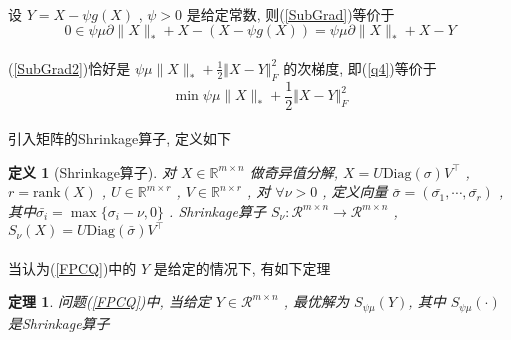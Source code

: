 \documentclass[a4paper, UTF8]{ctexart}				%
\newtheorem{theo}{\bf 定理}[section]			  %
\newtheorem{define}{\bf 定义}[section]
\numberwithin{equation}{section}				%
\newcommand{\upcite}[1]{\textsuperscript{\textsuperscript{\cite{#1}}}}
\begin{document}
			\paragraph{}
				\quad 设 $Y = X - \psi g(X)$ , $\psi > 0$ 是给定常数, 则(\ref{SubGrad})等价于
				\begin{equation}\label{SubGrad2}
					0 \in \psi \mu \partial \lVert{X}\rVert_* + X - (X - \psi g(X)) = \psi \mu \partial \lVert{X}\rVert_* + X -Y
				\end{equation}

			\paragraph{}
				\quad (\ref{SubGrad2})恰好是 $\psi \mu \lVert{X}\rVert_* + \frac{1}{2} \Vert{X - Y}\Vert^2_F$ 的次梯度, 即(\ref{q4})等价于 
				\begin{equation}\label{FPCQ}
					\min \psi \mu \lVert{X}\rVert_* + \frac{1}{2} \Vert{X - Y}\Vert^2_F
				\end{equation}
			
			\paragraph{}
				\quad 引入矩阵的Shrinkage算子\upcite{ma2011fixed}, 定义如下

			\begin{define}[Shrinkage算子]
				对 $X \in \mathbb{R}^{m \times n}$ 做奇异值分解, $X = U \text{Diag}(\sigma) V ^\top$ , $r = \text{rank}(X)$ , $U \in \mathbb{R}^{m \times r}$ , $V \in \mathbb{R}^{n \times r}$ , 对 $\forall \nu > 0$ , 定义向量 $\bar{\sigma} = (\bar{\sigma_1}, \cdots, \bar{\sigma_r})$ , 其中$\bar{\sigma_i} = \max \{\sigma_i - \nu, 0\}$ . Shrinkage算子 $S_\nu: \mathcal{R}^{m \times n} \rightarrow \mathcal{R}^{m \times n}$ , $S_\nu(X) = U \text{Diag}(\bar{\sigma}) V ^\top$
			\end{define}

			\paragraph{}
				\quad 当认为(\ref{FPCQ})中的 $Y$ 是给定的情况下, 有如下定理
			\begin{theo}
				问题(\ref{FPCQ})中, 当给定 $Y \in \mathcal{R}^{m \times n}$ , 最优解为 $S_{\psi \mu}(Y)$, 其中 $S_{\psi \mu}(\cdot)$ 是Shrinkage算子
			\end{theo}
			
\end{document}
